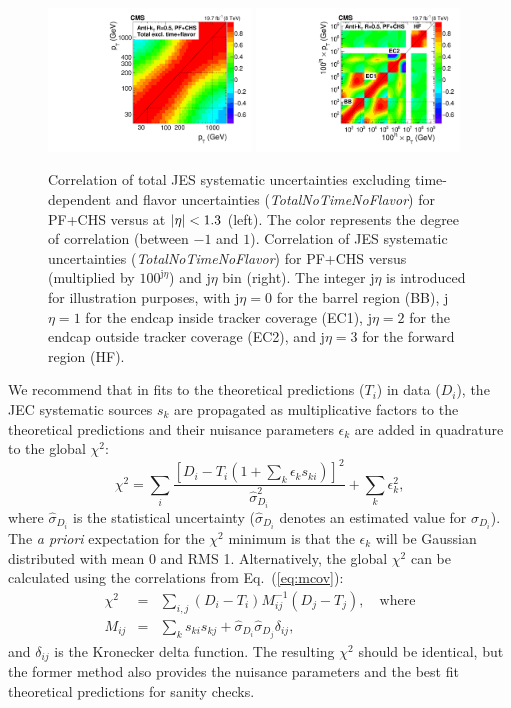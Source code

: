 \documentclass[11pt,twoside,a4paper,cmspaper,final,collab]{cms-tdr}
\begin{document}
\begin{figure}[htbp!]
\centering
\includegraphics[width=0.48\textwidth]{Figure_045-a.pdf}
\includegraphics[width=0.48\textwidth]{Figure_045-b.pdf}
\caption{\label{fig:mcov}
Correlation of total JES systematic uncertainties excluding time-dependent and flavor uncertainties (\textit{TotalNoTimeNoFlavor}) for PF+CHS versus \pt at $\lvert \eta \rvert<1.3$ (left). The color represents the degree of correlation (between $-1$ and $1$).
Correlation of JES systematic uncertainties (\textit{TotalNoTimeNoFlavor}) for PF+CHS versus \pt (multiplied by $100^{\mathrm{j}\eta}$) and j$\eta$ bin (right). The integer j$\eta$ is introduced for illustration purposes, with j$\eta=0$ for the barrel region (BB), j$\eta=1$ for the endcap inside tracker coverage (EC1), j$\eta=2$ for the endcap outside tracker coverage (EC2), and j$\eta=3$ for the forward region (HF).
}
\end{figure}

We recommend that in fits to the theoretical predictions ($T_i$) in data ($D_i$), the JEC systematic sources $s_k$ are propagated as multiplicative factors to the theoretical predictions and their nuisance parameters $\epsilon_k$ are added in quadrature to the global $\chi^2$:
\begin{equation}
\chi^2 = \sum_i \frac{ \left[ D_i - T_i(1+\sum_k\epsilon_k s_{ki}) \right]^2}{\hat{\sigma}_{D_i}^2} + \sum_k \epsilon_k^2 ,
\end{equation}
where $\hat{\sigma}_{D_i}$ is the statistical uncertainty ($\hat{\sigma}_{D_i}$ denotes an estimated value for $\sigma_{D_i}$).
The \textit{a priori} expectation for the $\chi^2$ minimum is that the $\epsilon_k$ will be Gaussian distributed with mean 0 and RMS 1.
Alternatively, the global $\chi^2$ can be calculated using the correlations from Eq.~(\ref{eq:mcov}):
\begin{eqnarray}
\chi^2 &=& \sum_{i,j} (D_i-T_i) M^{-1}_{ij} (D_j-T_j),\quad \mathrm{where} \\
M_{ij} &=& \sum_k s_{ki}s_{kj} + \hat{\sigma}_{D_i}\hat{\sigma}_{D_j}\delta_{ij},
\end{eqnarray}
and $\delta_{ij}$ is the Kronecker delta function.
The resulting $\chi^2$ should be identical, but the former method also provides the nuisance parameters and the best fit theoretical predictions for sanity checks.
\end{document}
